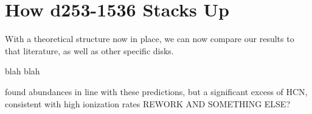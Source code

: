 












\section{How d253-1536 Stacks Up}


With a theoretical structure now in place, we can now compare our results to that literature, as well as other specific disks.

blah blah









\citet{Factor2017} found \hco abundances in line with these predictions, but a significant excess of HCN, consistent with high ionization rates REWORK AND SOMETHING ELSE?

